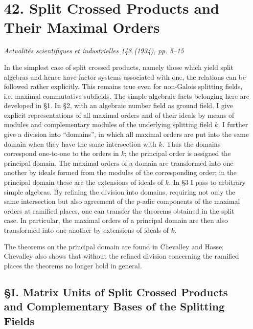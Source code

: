 \documentclass[11pt]{article}
\begin{document}
\section*{42. Split Crossed Products and Their Maximal Orders}

\begin{center}
\emph{Actualités scientifiques et industrielles 148 (1934), pp. 5--15}
\end{center}

In the simplest case of split crossed products, namely those which yield split algebras and hence have factor systems associated with one, the relations can be followed rather explicitly. This remains true even for non-Galois splitting fields, i.e. maximal commutative subfields. The simple algebraic facts belonging here are developed in §1. In §2, with an algebraic number field as ground field, I give explicit representations of all maximal orders and of their ideals by means of modules and complementary modules of the underlying splitting field \(k\). I further give a division into ``domains'', in which all maximal orders are put into the same domain when they have the same intersection with \(k\). Thus the domains correspond one-to-one to the orders in \(k\); the principal order is assigned the principal domain. The maximal orders of a domain are transformed into one another by ideals formed from the modules of the corresponding order; in the principal domain these are the extensions of ideals of \(k\). In §3 I pass to arbitrary simple algebras. By refining the division into domains, requiring not only the same intersection but also agreement of the \(p\)-adic components of the maximal orders at ramified places, one can transfer the theorems obtained in the split case. In particular, the maximal orders of a principal domain are then also transformed into one another by extensions of ideals of \(k\).

The theorems on the principal domain are found in Chevalley and Hasse; Chevalley also shows that without the refined division concerning the ramified places the theorems no longer hold in general.

\subsection*{§I. Matrix Units of Split Crossed Products and Complementary Bases of the Splitting Fields}
\end{document}
